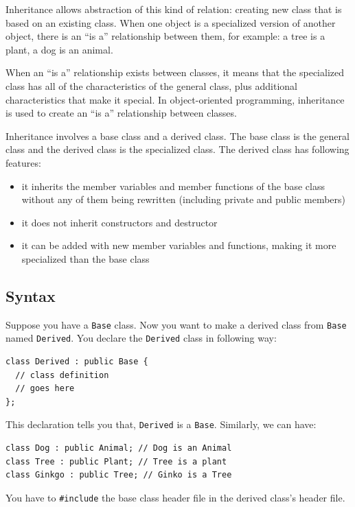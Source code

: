 \documentclass[11pt]{book}
\begin{document}
Inheritance allows abstraction of this kind of relation: creating new class that is based on an existing class. When one object is a specialized version of another object, there is an ``is a'' relationship between them, for example: a tree is a plant, a dog is an animal.

When an ``is a'' relationship exists between classes, it means that the specialized class has all of the characteristics of the general class, plus additional characteristics that make it special. In object-oriented programming, inheritance is used to create an ``is a'' relationship between classes. 

Inheritance involves a base class and a derived class. The base class is the general class and the derived class is the specialized class. The derived class has following features:
\begin{itemize}
\item it inherits the member variables and member functions of the base class without any of them being rewritten (including private and public members)
\item it does not inherit constructors and destructor
\item it can be added with new member variables and functions, making it more specialized than the base class
\end{itemize}

\subsection{Syntax}
\label{sec:orge1739a4}
Suppose you have a \texttt{Base} class. Now you want to make a derived class from \texttt{Base} named \texttt{Derived}. You declare the \texttt{Derived} class in following way:
\begin{verbatim}
class Derived : public Base {
  // class definition
  // goes here
};
\end{verbatim}

This declaration tells you that, \texttt{Derived} is a \texttt{Base}. Similarly, we can have:
\begin{verbatim}
class Dog : public Animal; // Dog is an Animal
class Tree : public Plant; // Tree is a plant
class Ginkgo : public Tree; // Ginko is a Tree
\end{verbatim}

You have to \texttt{\#include} the base class header file in the derived class's header file.
\end{document}
